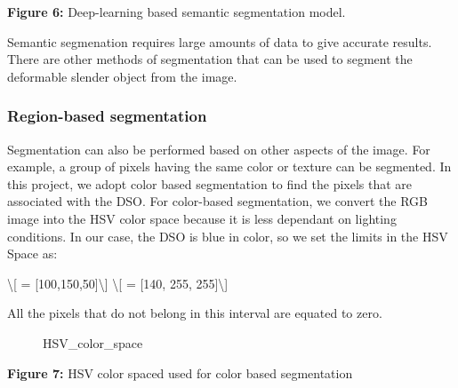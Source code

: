 \textbf{Figure 6:} Deep-learning based semantic segmentation model.

Semantic segmenation requires large amounts of data to give accurate
results. There are other methods of segmentation that can be used to
segment the deformable slender object from the image.

\subsubsection{Region-based
segmentation}\label{region-based-segmentation}

Segmentation can also be performed based on other aspects of the image.
For example, a group of pixels having the same color or texture can be
segmented. In this project, we adopt color based segmentation to find
the pixels that are associated with the DSO. For color-based
segmentation, we convert the RGB image into the HSV color space because
it is less dependant on lighting conditions. In our case, the DSO is
blue in color, so we set the limits in the HSV Space as:

\textbackslash{[} =
{[}100,150,50{]}\textbackslash{]} \textbackslash{[}
= {[}140, 255, 255{]}\textbackslash{]}

All the pixels that do not belong in this interval are equated to zero.

\begin{figure}
\centering
{}
\caption{HSV\_color\_space}
\end{figure}

\textbf{Figure 7:} HSV color spaced used for color based segmentation

